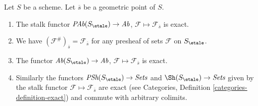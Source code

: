 \begin{lemma}
\label{lemma-stalk-exact}
Let $S$ be a scheme. Let $\overline{s}$ be a geometric point of $S$.
\begin{enumerate}
\item The stalk functor
$\textit{PAb}(S_\etale) \to \textit{Ab}$,
$\mathcal{F}  \mapsto  \mathcal{F}_{\overline{s}}$
is exact.
\item We have $(\mathcal{F}^\#)_{\overline{s}} = \mathcal{F}_{\overline{s}}$
for any presheaf of sets $\mathcal{F}$ on $S_\etale$.
\item The functor
$\textit{Ab}(S_\etale) \to \textit{Ab}$,
$\mathcal{F} \mapsto \mathcal{F}_{\overline{s}}$ is exact.
\item Similarly the functors
$\textit{PSh}(S_\etale) \to \textit{Sets}$ and
$\Sh(S_\etale) \to \textit{Sets}$ given by the stalk functor
$\mathcal{F} \mapsto \mathcal{F}_{\overline{s}}$ are exact (see
Categories, Definition \ref{categories-definition-exact})
and commute with arbitrary colimits.
\end{enumerate}
\end{lemma}

